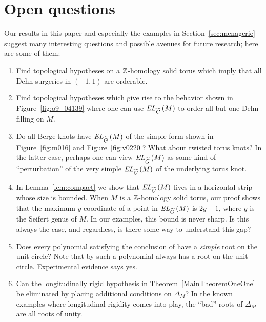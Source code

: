 \documentclass[tikz, sepfignums, defaultenums]{nmd/article}
\newcommand{\TEL}[1]{\mathit{EL}_\Gtil\left(#1\right)}
\begin{document}
\section{Open questions}
\label{sec:open}

Our results in this paper and especially the examples in
Section~\ref{sec:menagerie} suggest many interesting questions and
possible avenues for future research; here are some of them:

\begin{enumerate}[label={(\arabic*)}]
\item Find topological hypotheses on a ${\mathbb Z}$-homology solid torus
  which imply that all Dehn surgeries in $(-1, 1)$ are orderable.

\item Find topological hypotheses which give rise to the behavior
  shown in Figure~\ref{fig:o9_04139} where one can use $\TEL{M}$ to
  order all but one Dehn filling on $M$.

\item Do all Berge knots have $\TEL{M}$ of the simple form shown in
  Figure~\ref{fig:m016} and Figure~\ref{fig:v0220}?  What about
  twisted torus knots?  In the latter case, perhaps one can view
  $\TEL{M}$ as some kind of ``perturbation'' of the very simple
  $\TEL{M}$ of the underlying torus knot.

\item In Lemma~\ref{lem:compact} we show that $\TEL{M}$ lives in a
  horizontal strip whose size is bounded.  When $M$ is a ${\mathbb Z}$-homology
  solid torus, our proof shows that the maximum $y$ coordinate of a point
  in $\TEL{M}$ is $2 g - 1$, where $g$ is the Seifert genus of $M$.
  In our examples, this bound is never sharp.  Is this always the
  case, and regardless, is there some way to understand this gap?  

\item Does every polynomial satisfying the conclusion of 
  \cite[Corollary 1.3]{OSLensSpace2005} have a \emph{simple} root on
  the unit circle?  Note that by \cite{KonvalinaMatache2004} such a
  polynomial always has a root on the unit circle.  Experimental
  evidence says yes.

\item Can the longitudinally rigid hypothesis in
  Theorem~\ref{MainTheoremOneOne} be eliminated by placing additional
  conditions on $\Delta_M$?  In the known examples where longitudinal
  rigidity comes into play, the ``bad'' roots of $\Delta_M$ are
  all roots of unity.  


\end{enumerate}
\end{document}
